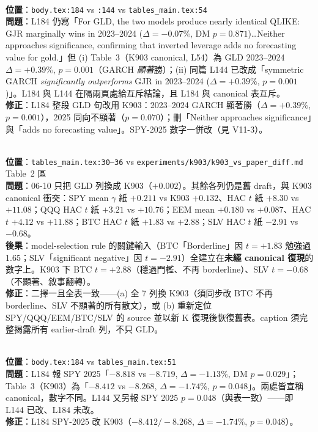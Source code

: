 \documentclass[11pt,a4paper]{article}
\newcommand{\high}{\textcolor{errorred}{\textbf{HIGH}}}
\begin{document}
\begin{description}[leftmargin=1.4em]

\item[\high\ V11-1 — GLD QLIKE 散文殘留舊 vintage（self-contradiction）]\hfill\\
\textbf{位置}：\texttt{body.tex:184} vs \texttt{:144} vs \texttt{tables\_main.tex:54}\\
\textbf{問題}：L184 仍寫「For GLD, the two models produce nearly identical QLIKE: GJR marginally wins in 2023--2024 ($\Delta=-0.07\%$, DM $p=0.871$)\ldots Neither approaches significance, confirming that inverted leverage adds no forecasting value for gold.」但 (i) Table~3（K903 canonical, L54）為 GLD 2023--2024 $\Delta=+0.39\%$, $p=0.001$（GARCH \emph{顯著}勝）；(ii) 同篇 L144 已改成「symmetric GARCH \emph{significantly outperforms} GJR in 2023--2024 ($\Delta=+0.39\%$, $p=0.001$)」。L184 與 L144 在隔兩頁處給互斥結論，且 L184 與 canonical 表互斥。\\
\textbf{修正}：L184 整段 GLD 句改用 K903：2023--2024 GARCH 顯著勝（$\Delta=+0.39\%$, $p=0.001$），2025 同向不顯著（$p=0.070$）；刪「Neither approaches significance」與「adds no forecasting value」。SPY-2025 數字一併改（見 V11-3）。

\item[\high\ V11-2 — Table 2（tab:gamma）混血 vintage]\hfill\\
\textbf{位置}：\texttt{tables\_main.tex:30--36} vs \texttt{experiments/k903/k903\_vs\_paper\_diff.md} Table~2 區\\
\textbf{問題}：06-10 只把 GLD 列換成 K903（$+0.002$）。其餘各列仍是舊 draft，與 K903 canonical 衝突：SPY mean $\gamma$ 紙 $+0.211$ vs K903 $+0.132$、HAC $t$ 紙 $+8.30$ vs $+11.08$；QQQ HAC $t$ 紙 $+3.21$ vs $+10.76$；EEM mean $+0.180$ vs $+0.087$、HAC $t$ $+4.12$ vs $+11.88$；BTC HAC $t$ 紙 $+1.83$ vs $+2.88$；SLV HAC $t$ 紙 $-2.91$ vs $-0.68$。\\
\textbf{後果}：model-selection rule 的關鍵輸入（BTC「Borderline」因 $t=+1.83$ 勉強過 1.65；SLV「significant negative」因 $t=-2.91$）全建立在\textbf{未經 canonical 復現}的數字上。K903 下 BTC $t=+2.88$（穩過門檻、不再 borderline）、SLV $t=-0.68$（不顯著、敘事翻轉）。\\
\textbf{修正}：二擇一且全表一致——(a) 全 7 列換 K903（須同步改 BTC 不再 borderline、SLV 不顯著的所有散文），或 (b) 重新定位 SPY/QQQ/EEM/BTC/SLV 的 source 並以新 K 復現後恢復舊表。caption 須完整揭露所有 earlier-draft 列，不只 GLD。

\item[\high\ V11-3 — SPY 2025 散文 vs Table 3 數字分歧]\hfill\\
\textbf{位置}：\texttt{body.tex:184} vs \texttt{tables\_main.tex:51}\\
\textbf{問題}：L184 報 SPY 2025「$-8.818$ vs $-8.719$, $\Delta=-1.13\%$, DM $p=0.029$」；Table~3（K903）為「$-8.412$ vs $-8.268$, $\Delta=-1.74\%$, $p=0.048$」。兩處皆宣稱 canonical，數字不同。L144 又另報 SPY 2025 $p=0.048$（與表一致）——即 L144 已改、L184 未改。\\
\textbf{修正}：L184 SPY-2025 改 K903（$-8.412/-8.268$, $\Delta=-1.74\%$, $p=0.048$）。


\end{description}
\end{document}
